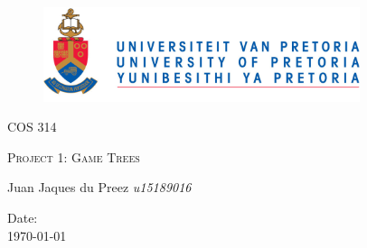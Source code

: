 \begin{titlepage}
	\begin{center}
		\begin{figure}[t]
			\centering
			\includegraphics[width=350px]{logo.PNG}
		\end{figure}
		\begin{center}
			\textsc{\LARGE COS 314}
		\end{center}
		\begin{center}		
			\textsc{\LARGE Project 1: Game Trees}		
		\end{center}
		
		\begin{flushright} \large
			Juan Jaques du Preez \newline \emph{u15189016} \newline
		\end{flushright}

{\large Date:}
\\
{\large \today}

	\end{center}
\end{titlepage}
